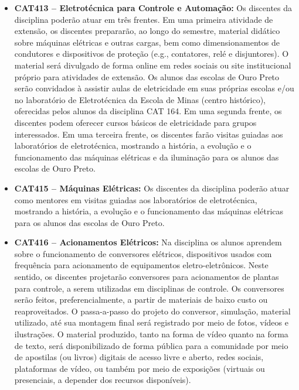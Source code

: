 \documentclass[
	12pt,				%
	openright,			%
	oneside,			%
	a4paper,			%
	english,			%
	brazil				%
	]{abntex2}
\begin{document}
\begin{itemize}
    \item \textbf{CAT413 -- Eletrotécnica para Controle e Automação:} Os discentes da disciplina poderão atuar em três frentes. Em uma primeira atividade de extensão, os discentes prepararão, ao longo do semestre, material didático sobre máquinas elétricas e outras cargas, bem como dimensionamentos de condutores e dispositivos de proteção (e.g., contatores, relé e disjuntores). O material será divulgado de forma online em redes sociais ou site institucional próprio para atividades de extensão. Os alunos das escolas de Ouro Preto serão convidados à assistir aulas de eletricidade em suas próprias escolas e/ou no laboratório de Eletrotécnica da Escola de Minas (centro histórico), oferecidas pelos alunos da disciplina CAT 164. Em uma segunda frente, os discentes podem oferecer cursos básicos de eletricidade para grupos interessados. Em uma terceira frente, os discentes farão visitas guiadas aos laboratórios de eletrotécnica, mostrando a história, a evolução e o funcionamento das máquinas elétricas e da iluminação para os alunos das escolas de Ouro Preto.

    \item \textbf{CAT415 -- Máquinas Elétricas:} Os discentes da disciplina poderão atuar como mentores em visitas guiadas aos laboratórios de eletrotécnica, mostrando a história, a evolução e o funcionamento das máquinas elétricas para os alunos das escolas de Ouro Preto.

    \item \textbf{CAT416 -- Acionamentos Elétricos:} Na disciplina os alunos aprendem sobre o funcionamento de conversores elétricos, dispositivos usados com frequência para acionamento de equipamentos eletro-eletrônicos. Neste sentido, os discentes projetarão conversores para acionamentos de plantas para controle, a serem utilizadas em disciplinas de controle. Os conversores serão feitos, preferencialmente, a partir de materiais de baixo custo ou reaproveitados. O passa-a-passo do  projeto do conversor, simulação, material utilizado, até sua montagem final será registrado por meio de fotos, vídeos e ilustrações. O material produzido, tanto na forma de vídeo quanto na forma de texto, será disponibilizado de forma pública para a comunidade por meio de apostilas (ou livros) digitais de acesso livre e aberto, redes sociais, plataformas de vídeo, ou também por meio de exposições (virtuais ou presenciais, a depender dos recursos disponíveis).


\end{itemize}
\end{document}
